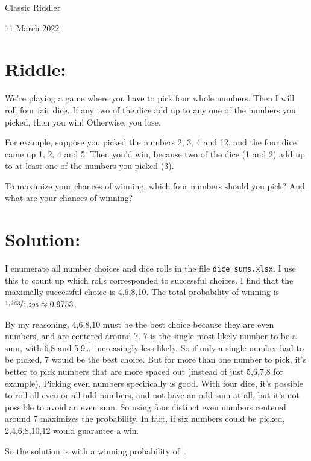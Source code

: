 \documentclass{article}
\begin{document}
\pagestyle{empty} %

\begin{center}
{\LARGE Classic Riddler}

\vspace{0.15in}

{\Large 11 March 2022}
\end{center}


\section*{Riddle:}

We're playing a game where you have to pick four whole numbers.
Then I will roll four fair dice.
If any two of the dice add up to any one of the numbers you picked, then you win!
Otherwise, you lose.

For example, suppose you picked the numbers 2, 3, 4 and 12, and the four dice came up 1, 2, 4 and 5.
Then you'd win, because two of the dice (1 and 2) add up to at least one of the numbers you picked (3).

To maximize your chances of winning, which four numbers should you pick?
And what are your chances of winning?


\section*{Solution:}

I enumerate all number choices and dice rolls in the file \texttt{dice\_sums.xlsx}.
I use this to count up which rolls corresponded to successful choices.
I find that the maximally successful choice is 4,6,8,10.
The total probability of winning is $\nicefrac{1,263}{1,296}\approx0.9753$.

By my reasoning, 4,6,8,10 must be the best choice because they are even numbers, and are centered around 7.
7 is the single most likely number to be a sum, with 6,8 and 5,9\dots\ increasingly less likely.
So if only a single number had to be picked, 7 would be the best choice.
But for more than one number to pick, it's better to pick numbers that are more spaced out (instead of just 5,6,7,8 for example).
Picking even numbers specifically is good.
With four dice, it's possible to roll all even or all odd numbers, and not have an odd sum at all, but it's not possible to avoid an even sum.
So using four distinct even numbers centered around 7 maximizes the probability.
In fact, if six numbers could be picked, 2,4,6,8,10,12 would guarantee a win.

So the solution is  with a winning probability of \,.
\end{document}
